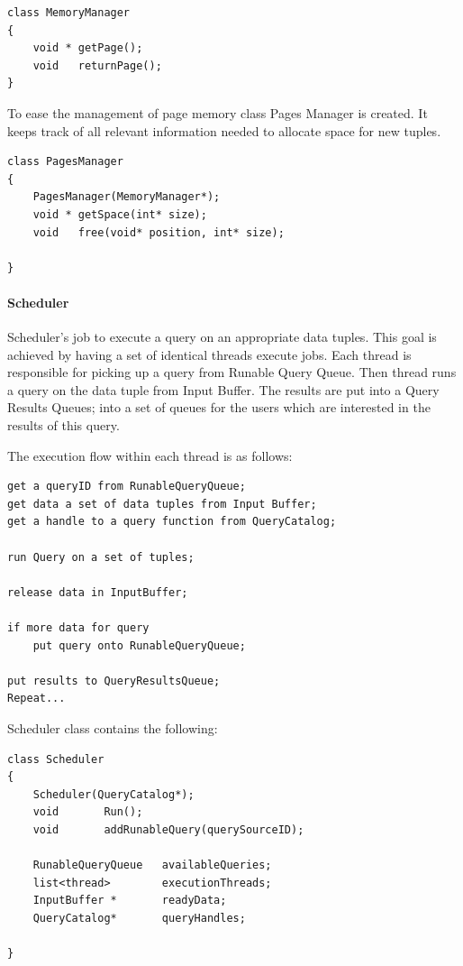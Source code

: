 \documentclass[14pt]{article}
\begin{document}
\begin{verbatim}
class MemoryManager
{
    void * getPage();
	void   returnPage();
}
\end{verbatim}

\noindent To ease the management of page memory class Pages Manager is created. It keeps track of all relevant information needed to allocate space for new tuples.

\begin{verbatim}
class PagesManager
{
    PagesManager(MemoryManager*);
    void * getSpace(int* size);
    void   free(void* position, int* size);
    
}
\end{verbatim}

\paragraph{Scheduler}

Scheduler's job to execute a query on an appropriate data tuples. This goal is achieved by having a set of identical threads execute jobs. Each thread is responsible for picking up a query from Runable Query Queue. Then thread runs a query on the data tuple from Input Buffer. The results are put into a Query Results Queues; into a set of queues for the users which are interested in the results of this query. 

The execution flow within each thread is as follows:

\begin{verbatim}
get a queryID from RunableQueryQueue;
get data a set of data tuples from Input Buffer;
get a handle to a query function from QueryCatalog;

run Query on a set of tuples;

release data in InputBuffer;

if more data for query 
	put query onto RunableQueryQueue;

put results to QueryResultsQueue;
Repeat...

\end{verbatim}

Scheduler class contains the following:

\begin{verbatim}
class Scheduler
{
	Scheduler(QueryCatalog*);
    void       Run();
    void       addRunableQuery(querySourceID);

    RunableQueryQueue   availableQueries;
    list<thread>        executionThreads;
    InputBuffer *       readyData;
	QueryCatalog*       queryHandles;
	
}
\end{verbatim}
\end{document}
